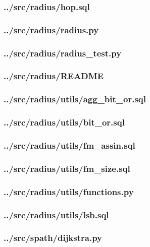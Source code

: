 \subsubsection{../src/radius/hop.sql}

\subsubsection{../src/radius/radius.py}

\subsubsection{../src/radius/radius\_test.py}

\subsubsection{../src/radius/README}

\subsubsection{../src/radius/utils/agg\_bit\_or.sql}

\subsubsection{../src/radius/utils/bit\_or.sql}

\subsubsection{../src/radius/utils/fm\_assin.sql}

\subsubsection{../src/radius/utils/fm\_size.sql}

\subsubsection{../src/radius/utils/functions.py}

\subsubsection{../src/radius/utils/lsb.sql}

\subsubsection{../src/spath/dijkstra.py}

